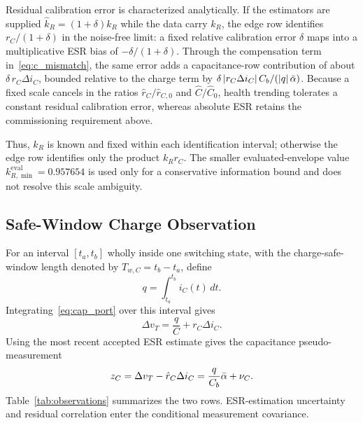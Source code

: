 Residual calibration error is characterized analytically. If the estimators are supplied $\hat k_R=(1+\delta)k_R$ while the data carry $k_R$, the edge row identifies $r_C/(1+\delta)$ in the noise-free limit: a fixed relative calibration error $\delta$ maps into a multiplicative ESR bias of $-\delta/(1+\delta)$. Through the compensation term in~\eqref{eq:c_mismatch}, the same error adds a capacitance-row contribution of about $\delta\,r_C\Delta i_C$, bounded relative to the charge term by $\delta\,|r_C\Delta i_C|\,C_b/(|q|\,\bar{\alpha})$. Because a fixed scale cancels in the ratios $\hat r_C/\hat r_{C,0}$ and $\hat C/\hat C_0$, health trending tolerates a constant residual calibration error, whereas absolute ESR retains the commissioning requirement above.

Thus, $k_R$ is known and fixed within each identification interval; otherwise the edge row identifies only the product $k_Rr_C$. The smaller evaluated-envelope value $k_{R,\min}^{\mathrm{eval}}=0.957654$ is used only for a conservative information bound and does not resolve this scale ambiguity.

\subsection{Safe-Window Charge Observation}

For an interval $[t_a,t_b]$ wholly inside one switching state, with the charge-safe-window length denoted by $T_{w,C}=t_b-t_a$, define
\begin{equation}
q=\int_{t_a}^{t_b}i_C(t)\,dt.
\label{eq:charge}
\end{equation}
Integrating~\eqref{eq:cap_port} over this interval gives
\begin{equation}
\Delta v_T=\frac{q}{C}+r_C\Delta i_C.
\label{eq:integral_port}
\end{equation}
Using the most recent accepted ESR estimate gives the capacitance pseudo-measurement
\begin{equation}
z_C=\Delta v_T-\hat r_C\Delta i_C
=\frac{q}{C_b}\bar{\alpha}+\nu_C.
\label{eq:c_observation}
\end{equation}
Table~\ref{tab:observations} summarizes the two rows. ESR-estimation uncertainty and residual correlation enter the conditional measurement covariance.

